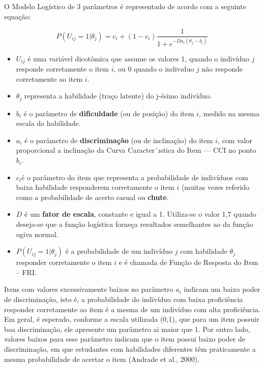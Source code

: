 \documentclass[12pt]{article}
\begin{document}
\newpage

O Modelo Logístico de 3 parâmetros é representado de acordo com a seguinte equação:

\begin{equation}
    P(U_{ij}=1|\theta_{j})= c_{i}+(1-c_{i})\frac{1}{1+e^{-Da_{i}(\theta_{j}-b_{i})}}
\end{equation}
\vskip0.3cm

\begin{itemize}
\item $U_{ij}$ é uma variável dicotômica que assume os valores 1, quando o indivíduo $j$ responde corretamente o item $i$, ou 0 quando o indivıduo $j$ não responde
corretamente ao item $i$.
\item $\theta_{j}$ representa a habilidade (traço latente) do j-ésimo indivíduo.
\item $b_{i}$ é o parâmetro de \textbf{dificuldade} (ou de posição) do item $i$, medido na mesma
escala da habilidade.
\item $a_{i}$ é o parâmetro de \textbf{discriminação} (ou de inclinação) do item $i$, com valor
proporcional a inclinação da Curva Caracter´ıstica do Item — CCI no
ponto $b_{i}$.
\item $c_{i} $é o parâmetro do item que representa a probabilidade de indivíduos
com baixa habilidade responderem corretamente o item $i$ (muitas vezes
referido como a probabilidade de acerto casual ou \textbf{chute}.
\item $D$ é um \textbf{fator de escala}, constante e igual a 1. Utiliza-se o valor 1,7 quando deseja-se que a função logística forneça resultados semelhantes ao da
função ogiva normal.
\item $P(U_{ij}=1|\theta_{j})$ é a probabilidade de um indivíduo $j$ com habilidade $\theta_{j}$ responder corretamente o item $i$ e é chamada de Função de Resposta do Item – FRI.
\end{itemize}


Itens com valores excessivamente baixos no parâmetro $a_{i}$ indicam um baixo poder de discriminação, isto é, a probabilidade do indivíduo com baixa proficiência responder corretamente ao item é a mesma de um indivíduo com alta proficiência. Em geral, é esperado, conforme a escala utilizada (0,1), que para um item possuir boa discriminação, ele apresente um parâmetro ai maior que 1. Por outro lado, valores baixos para esse parâmetro indicam que o item possui baixo poder de discriminação, em que estudantes com habilidades diferentes têm praticamente a mesma probabilidade de acertar o item (Andrade et al., 2000).
\end{document}
